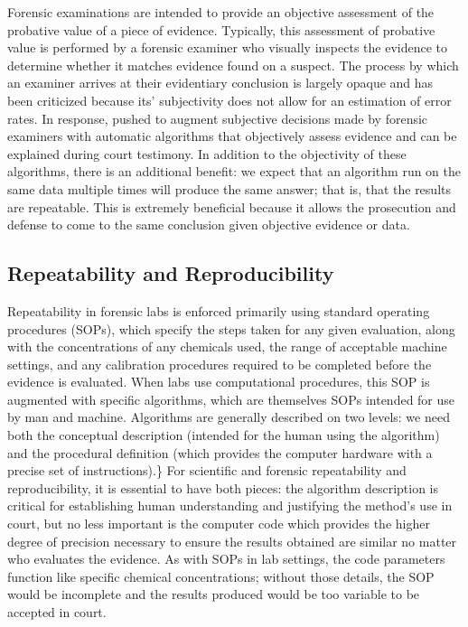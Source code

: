 Forensic examinations are intended to provide an objective assessment of
the probative value of a piece of evidence. Typically, this assessment
of probative value is performed by a forensic examiner who visually
inspects the evidence to determine whether it matches evidence found on
a suspect. The process by which an examiner arrives at their evidentiary
conclusion is largely opaque and has been criticized 
because its' subjectivity does not allow for an estimation of error
rates. In response, \citet{council_strengthening_2009} pushed to augment
subjective decisions made by forensic examiners with automatic
algorithms that objectively assess evidence and can be explained during
court testimony. In addition to the objectivity of these algorithms,
there is an additional benefit: we expect that an algorithm run on the
same data multiple times will produce the same answer; that is, that the
results are repeatable. This is extremely beneficial because it allows
the prosecution and defense to come to the same conclusion given
objective evidence or data.

\hypertarget{repeatability-and-reproducibility}{%
\subsection{Repeatability and
Reproducibility}\label{repeatability-and-reproducibility}}

Repeatability in forensic labs is enforced primarily using standard
operating procedures (SOPs), which specify the steps taken for any given
evaluation, along with the concentrations of any chemicals used, the
range of acceptable machine settings, and any calibration procedures
required to be completed before the evidence is evaluated. When labs use
computational procedures, this SOP is augmented with specific
algorithms, which are themselves SOPs intended for use by man and
machine. Algorithms are generally described on two levels: we need both
the conceptual description (intended for the human using the algorithm)
and the procedural definition (which provides the computer hardware with
a precise set of instructions).\} For scientific and forensic
repeatability and reproducibility, it is essential to have both pieces:
the algorithm description is critical for establishing human
understanding and justifying the method's use in court, but no less
important is the computer code which provides the higher degree of
precision necessary to ensure the results obtained are similar no matter
who evaluates the evidence. As with SOPs in lab settings, the code
parameters function like specific chemical concentrations; without those
details, the SOP would be incomplete and the results produced would be
too variable to be accepted in court.

